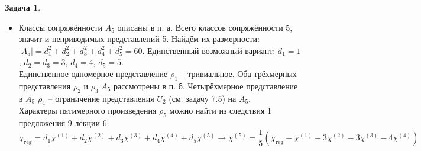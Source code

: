 \documentclass[12pt]{article}
\theoremstyle{definition}
\newtheorem{zad}{Задача}[section]
\begin{document}
\begin{zad}
\begin{itemize}
\begin{enumerate}
\begin{equation*}
\begin{array}{ccc}
    \cos\frac{2\pi}{3} & -\sin\frac{2\pi}{3} & 0\\
    \sin\frac{2\pi}{3} & \cos\frac{2\pi}{3} & 0\\
    0 & 0 & 1\\
    \end{array}
    \right),\quad (a,b)(c,d)\rightarrow
        \left(
    \begin{array}{ccc}
    \cos\pi & -\sin\pi & 0\\
    \sin\pi & \cos\pi & 0\\
    0 & 0 & 1\\
    \end{array}
    \right)
    \end{equation*}
    \begin{equation*}
        (1,2,3,4,5)\rightarrow
        \left(
    \begin{array}{ccc}
    \cos\frac{4\pi}{5} & -\sin\frac{4\pi}{5} & 0\\
    \sin\frac{4\pi}{5} & \cos\frac{4\pi}{5} & 0\\
    0 & 0 & 1\\
    \end{array}
    \right),\quad (1,2,3,5,4)\rightarrow
        \left(
    \begin{array}{ccc}
    \cos\frac{2\pi}{5} & -\sin\frac{2\pi}{5} & 0\\
    \sin\frac{2\pi}{5} & \cos\frac{2\pi}{5} & 0\\
    0 & 0 & 1\\
    \end{array}
    \right)
    \end{equation*}
    \end{enumerate}
    \item[в)] Классы сопряжённости $A_5$ описаны в п. а. Всего классов сопряжённости 5, значит и неприводимых представлений 5. Найдём их размерности: $|A_5|=d_1^2+d_2^2+d_3^2+d_4^2+d_5^2=60$. Единственный возможный вариант: $d_1=1$, $d_2=d_3=3$, $d_4=4$, $d_5=5$.\\
    Единственное одномерное представление $\rho_1$ -- тривиальное. Оба трёхмерных представления $\rho_2$ и $\rho_3$ $A_5$ рассмотрены в п. б. Четырёхмерное представление в $A_5$ $\rho_4$ -- ограничение представления $U_2$ (см. задачу 7.5) на $A_5$.\\
    Характеры пятимерного произведения $\rho_5$ можно найти из следствия 1 предложения 9 лекции 6:
    \begin{equation}
        \chi_\text{reg}=d_1\chi^{(1)}+d_2\chi^{(2)}+d_3\chi^{(3)}+d_4\chi^{(4)}+d_5\chi^{(5)}\rightarrow \chi^{(5)}=\frac{1}{5}(\chi_\text{reg}-\chi^{(1)}-3\chi^{(2)}-3\chi^{(3)}-4\chi^{(4)})

\end{equation}
\end{itemize}
\end{zad}
\end{document}
